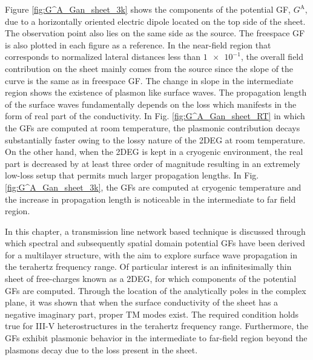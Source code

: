 \documentclass[12pt]{article}
\begin{document}
Figure \ref{fig:G^A_Gan_sheet_3k} shows the components of the potential GF, $G^{\mathrm A}$, due to a horizontally oriented electric dipole located on the top side of the sheet. The observation point also lies on the same side as the source. The freespace GF is also plotted in each figure as a reference. In the near-field region that corresponds to normalized lateral distances less than $\num{1e-1}$, the overall field contribution on the sheet mainly comes from the source since the slope of the curve is the same as in freespace GF. The change in slope in the intermediate region shows the existence of plasmon like surface waves. The propagation length of the surface waves fundamentally depends on the loss which manifests in the form of real part of the conductivity. In Fig. \ref{fig:G^A_Gan_sheet_RT} in which the GFs are computed at room temperature, the plasmonic contribution decays substantially faster owing to the lossy nature of the 2DEG at room temperature. On the other hand, when the 2DEG is kept in a cryogenic environment, the real part is decreased by at least three order of magnitude resulting in an extremely low-loss setup that permits much larger propagation lengths. In Fig. \ref{fig:G^A_Gan_sheet_3k}, the GFs are computed at cryogenic temperature and the increase in propagation length is noticeable in the intermediate to far field region.



In this chapter, a transmission line network based technique is discussed through which spectral and subsequently spatial domain potential GFs have been derived for a multilayer structure, with the aim to explore surface wave propagation in the terahertz frequency range. Of particular interest is an infinitesimally thin sheet of free-charges known as a 2DEG, for which components of the potential GFs are computed. Through the location of the analytically poles in the complex plane, it was shown that when the surface conductivity of the sheet has a negative imaginary part, proper TM modes exist. The required condition holds true for III-V heterostructures in the terahertz frequency range. Furthermore, the GFs exhibit plasmonic behavior in the intermediate to far-field region beyond the plasmons decay due to the loss present in the sheet.

\clearpage %
% 


\end{document}
